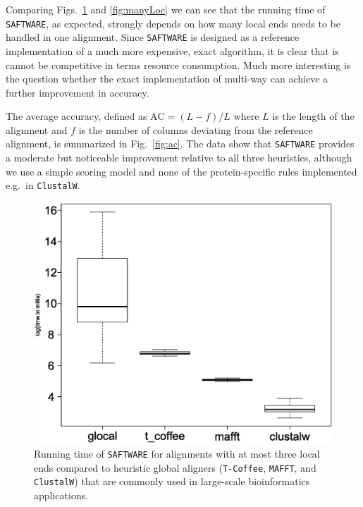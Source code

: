 \documentclass[a4paper,10pt]{article}
\newcommand{\TODO}[1]{\begingroup\color{red}#1\endgroup}
\newcommand{\PFS}[1]{\begingroup\color{green}#1\endgroup}
\newcommand{\SAFTWARE}{\TODO{\texttt{SAFTWARE}}}
\begin{document}
Comparing Figs.~\ref{fig:littleLoc} and \ref{fig:manyLoc} we can see that
the running time of \SAFTWARE, as expected, strongly depends on how many
local ends needs to be handled in one alignment. Since \SAFTWARE{} is
designed as a reference implementation of a much more expensive, exact
algorithm, it is clear that is cannot be competitive in terms resource
consumption. Much more interesting is the question whether the exact
implementation of multi-way can achieve a further improvement in accuracy.

%
%

\PFS{The average accuracy, defined as $\mbox{AC}=(L-f)/L$ where $L$ is the
  length of the alignment and $f$ is the number of columns deviating from
  the reference alignment, is summarized in Fig.~\ref{fig:ac}. The data
  show that \SAFTWARE{} provides a moderate but noticeable improvement
  relative to all three heuristics, although we use a simple scoring model
  and none of the protein-specific rules implemented e.g.\ in
  \texttt{ClustalW}. 

\begin{figure}
  \begin{center}
    \includegraphics[width=1\columnwidth]{times_smaller4_boxplot.eps}
  \end{center}
  \caption{Running time of \SAFTWARE{} for alignments with at most three
    local ends compared to heuristic global aligners (\texttt{T-Coffee},
    \texttt{MAFFT}, and \texttt{ClustalW}) that are commonly used in
    large-scale bioinformatics applications.}
 \label{fig:littleLoc}
\end{figure}

}
\end{document}

